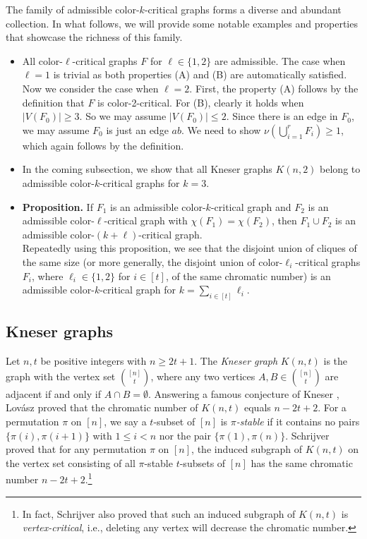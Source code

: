 \documentclass[10pt]{article}
\begin{document}
The family of admissible color-$k$-critical graphs forms a diverse and abundant collection.
In what follows, we will provide some notable examples and properties that showcase the richness of this family.
\begin{itemize}
\item All color-$\ell$-critical graphs $F$ for $\ell\in \{1,2\}$ are admissible.
The case when $\ell=1$ is trivial as both properties (A) and (B) are automatically satisfied.
Now we consider the case when $\ell=2$. First, the property (A) follows by the definition that $F$ is color-2-critical.
For (B), clearly it holds when $|V(F_0)|\geq 3$. So we may assume $|V(F_0)|\leq 2$.
Since there is an edge in $F_0$, we may assume $F_0$ is just an edge $ab$.
We need to show $\nu(\bigcup_{i=1}^{r}F_i)\geq 1$, which again follows by the definition.

\item In the coming subsection, we show that all Kneser graphs $K(n,2)$ belong to admissible color-$k$-critical graphs for $k=3$.

\item {\bf Proposition.} If $F_1$ is an admissible color-$k$-critical graph and $F_2$ is an admissible color-$\ell$-critical graph with $\chi(F_1)=\chi(F_2)$, then $F_1\cup F_2$ is an admissible color-$(k+\ell)$-critical graph.\\
    \vskip -3mm
    Repeatedly using this proposition, we see that the disjoint union of cliques of the same size (or more generally, the disjoint union of color-$\ell_i$-critical graphs $F_i$, where $\ell_i\in \{1,2\}$ for $i\in [t]$, of the same chromatic number) is an admissible color-$k$-critical graph for $k=\sum_{i\in [t]} \ell_i$.

\end{itemize}

\subsection{Kneser graphs}\label{Subs:Kneser}

Let $n,t$ be positive integers with $n\geq 2t+1$.
The {\it Kneser graph} $K(n,t)$ is the graph with the vertex set $\binom{[n]}{t}$,
where any two vertices $A,B\in \binom{[n]}{t}$ are adjacent if and only if $A\cap B=\emptyset$.
Answering a famous conjecture of Kneser \cite{Kneser}, Lov\'asz \cite{Lov78} proved that the chromatic number of $K(n,t)$ equals $n-2t+2$.
For a permutation $\pi$ on $[n]$, we say a $t$-subset of $[n]$ is {\it $\pi$-stable} if it contains no pairs $\{\pi(i),\pi(i+1)\}$ with $1\leq i<n$ nor the pair $\{\pi(1),\pi(n)\}$.
Schrijver \cite{Sch78} proved that for any permutation $\pi$ on $[n]$,
the induced subgraph of $K(n,t)$ on the vertex set consisting of all $\pi$-stable $t$-subsets of $[n]$ has the same chromatic number $n-2t+2$.\footnote{In fact, Schrijver \cite{Sch78} also proved that such an induced subgraph of $K(n,t)$ is {\it vertex-critical}, i.e., deleting any vertex will decrease the chromatic number.}
\end{document}
